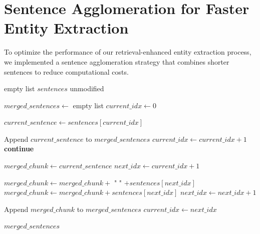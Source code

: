 \section*{Sentence Agglomeration for Faster Entity Extraction}\label{appendix: sentence agglomeration}

To optimize the performance of our retrieval-enhanced entity extraction process, we implemented a sentence agglomeration strategy that combines shorter sentences to reduce computational costs.

\begin{algorithm}
\caption{Sentence Agglomeration Algorithm}
\begin{algorithmic}[1]
        \State \Return empty list
    \EndIf
        \State \Return $sentences$ unmodified
    \EndIf
    
    \State $merged\_sentences \gets$ empty list
    \State $current\_idx \gets 0$
    
        \State $current\_sentence \gets sentences[current\_idx]$
        
            \State Append $current\_sentence$ to $merged\_sentences$
            \State $current\_idx \gets current\_idx + 1$
            \State \textbf{continue}
        \EndIf
        
        \State $merged\_chunk \gets current\_sentence$
        \State $next\_idx \gets current\_idx + 1$
        
                \State $merged\_chunk \gets merged\_chunk + $ " " $+ sentences[next\_idx]$
            \Else
                \State $merged\_chunk \gets merged\_chunk + sentences[next\_idx]$
            \EndIf
            \State $next\_idx \gets next\_idx + 1$
        \EndWhile
        
        \State Append $merged\_chunk$ to $merged\_sentences$
        \State $current\_idx \gets next\_idx$
    \EndWhile
    
    \State \Return $merged\_sentences$
\EndProcedure
\end{algorithmic}
\end{algorithm}


